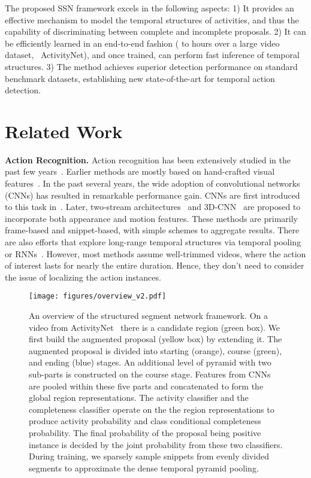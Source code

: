 \documentclass[10pt,twocolumn,letterpaper]{article}
\begin{document}
The proposed SSN framework excels in the following aspects:
1) It provides an effective mechanism to model the temporal structures of activities,
and thus the capability of discriminating between complete and incomplete proposals.
2) It can be efficiently learned in an end-to-end fashion
({ to } hours over a large video dataset, \eg~ActivityNet),
and once trained, can perform fast inference of temporal structures.
3) The method achieves superior detection performance on standard benchmark datasets, establishing new state-of-the-art for temporal action detection. 


\section{Related Work}
\label{related}

\noindent \textbf{Action Recognition.}
Action recognition has been extensively studied in the past few years~\cite{Laptev05STIP,WangS13IDT,Simonyan14TwoStream,Tran15C3D,WangQT15TDD,Wang2016TSN,ZhangWW0W16}.
Earlier methods are mostly based on hand-crafted visual features~\cite{Laptev05STIP,WangS13IDT}.
In the past several years, the wide adoption of convolutional networks (CNNs)
has resulted in remarkable performance gain.
CNNs are first introduced to this task in~\cite{KarpathyCVPR14Sports1M}.
Later, two-stream architectures~\cite{Simonyan14TwoStream} and 3D-CNN~\cite{Tran15C3D}
are proposed to incorporate both appearance and motion features.
These methods are primarily frame-based and snippet-based, with simple schemes to aggregate results.
There are also efforts that explore long-range temporal structures via temporal pooling or RNNs~\cite{WangQT15TDD,Ng15BeyondSnippet,DonahueJ2015LRCN}.
However, most methods assume well-trimmed videos, where
the action of interest lasts for nearly the entire duration.
Hence, they don't need to consider the issue of localizing the action instances.

\begin{figure*}[t]
	\centering
	\texttt{[image: figures/overview\_v2.pdf]}
	\caption{\small
		An overview of the structured segment network framework. On a video from ActivityNet~\cite{caba2015activitynet} there is a candidate region (green box). We first build the augmented proposal (yellow box) by extending it.
		The augmented proposal is divided into starting (orange), course (green), and ending (blue) stages. An additional level of pyramid with two sub-parts is constructed on the course stage. Features from CNNs are pooled within these five parts and concatenated to form the global region representations.
		The activity classifier and the completeness classifier operate on the the region representations to produce activity probability and class conditional completeness probability.
		The final probability of the proposal being positive instance is decided by the joint probability from these two classifiers.
		During training, we sparsely sample  snippets from evenly divided segments to approximate the dense temporal pyramid pooling.}
	\label{fig:overview}
\end{figure*}
\end{document}
